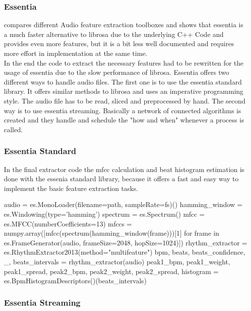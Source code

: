 \subsubsection{Essentia}

\cite{audiofeattoolb} compares different Audio feature extraction toolboxes and shows that essentia is a much faster alternative to librosa due to the underlying C++ Code and provides even more features, but it is a bit less well documented and requires more effort in implementation at the same time.\\ 
In the end the code to extract the necessary features had to be rewritten for the usage of essentia due to the slow performance of librosa. Essentia offers two different ways to handle audio files. The first one is to use the essentia standard library. It offers similar methods to librosa and uses an imperative programming style. The audio file has to be read, sliced and preprocessed by hand. 
The second way is to use essentia streaming. Basically a network of connected algorithms is created and they handle and schedule the "how and when" whenever a process is called.

\subsubsection{Essentia Standard}

In the final extractor code the mfcc calculation and beat histogram estimation is done with the essenia standard library, because it offers a fast and easy way to implement the basic feature extraction tasks. 
\begin{pythonCode}[frame=single,label={lst:esss},caption={essentia standard},captionpos=b]
audio = es.MonoLoader(filename=path, sampleRate=fs)()
hamming_window = es.Windowing(type='hamming')
spectrum = es.Spectrum()
mfcc = es.MFCC(numberCoefficients=13)
mfccs = numpy.array([mfcc(spectrum(hamming_window(frame)))[1] 
	for frame in es.FrameGenerator(audio, frameSize=2048, hopSize=1024)])
rhythm_extractor = es.RhythmExtractor2013(method="multifeature")
bpm, beats, beats_confidence, _, beats_intervals = rhythm_extractor(audio)
peak1_bpm, peak1_weight, peak1_spread, peak2_bpm, peak2_weight, peak2_spread, histogram =
	es.BpmHistogramDescriptors()(beats_intervals)
\end{pythonCode}

\subsubsection{Essentia Streaming}

